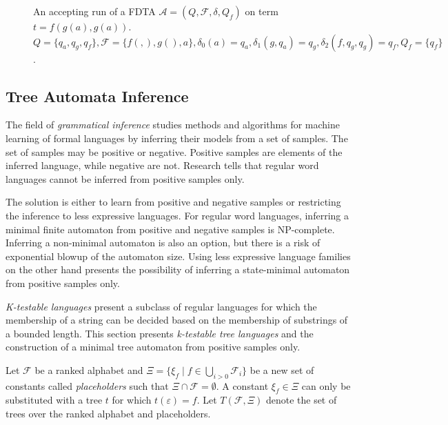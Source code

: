 \begin{figure}[H]
    \centering
    \caption{An accepting run of a FDTA $\mathcal{A} = (Q, \mathcal{F}, \delta, Q_f)$ on term $t = f(g(a), g(a))$. $Q = \{q_a, q_g, q_f\}, \mathcal{F} = \{f(,), g(), a\}, \delta_0(a) = q_a, \delta_1(g, q_a) = q_g, \delta_2(f, q_g, q_g) = q_f, Q_f = \{q_f\}$.}
    \label{fig_ta_run}
\end{figure}

\subsection{Tree Automata Inference}
The field of \emph{grammatical inference} studies methods and algorithms for machine learning of formal languages by inferring their models from a set of samples. The set of samples may be positive or negative. Positive samples are elements of the inferred language, while negative are not. Research tells that regular word languages cannot be inferred from positive samples only\cite{Gold78}.

The solution is either to learn from positive and negative samples or restricting the inference to less expressive languages. For regular word languages, inferring a minimal finite automaton from positive and negative samples is NP-complete\cite{Gold78}. Inferring a non-minimal automaton is also an option, but there is a risk of exponential blowup of the automaton size. Using less expressive language families on the other hand presents the possibility of inferring a state-minimal automaton from positive samples only\cite{Garcia90}. 

\emph{K-testable languages} present a subclass of regular languages for which the membership of a string can be decided based on the membership of substrings of a bounded length. This section presents \emph{k-testable tree languages} and the construction of a minimal tree automaton from positive samples only.

\begin{defn}
Let $\mathcal{F}$ be a ranked alphabet and $\Xi = \{\xi_f \; | \; f \in \bigcup_{i>0} \mathcal{F}_i\}$ be a new set of constants called \emph{placeholders} such that $\Xi \cap \mathcal{F} = \emptyset$. A constant $\xi_f \in \Xi$ can only be substituted with a tree $t$ for which $t(\varepsilon) = f$. Let $T(\mathcal{F}, \Xi)$ denote the set of trees over the ranked alphabet and placeholders.
\end{defn}

